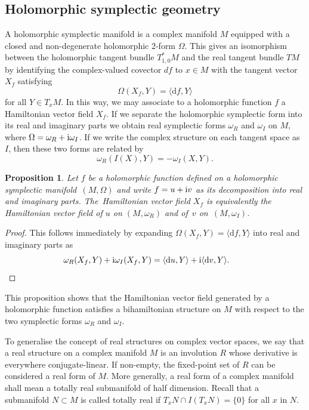 \documentclass[pdftex]{sigma}
\numberwithin{equation}{section}
\newtheorem{Proposition}[Theorem]{Proposition}
 { \theoremstyle{definition}
\newtheorem{Definition}[Theorem]{Definition}
\newtheorem{Note}[Theorem]{Note}
\newtheorem{Example}[Theorem]{Example}
\newtheorem{Remark}[Theorem]{Remark} }
\begin{document}
\subsection{Holomorphic symplectic geometry}
A holomorphic symplectic manifold is a complex manifold $M$ equipped with a closed and non-degenerate holomorphic 2-form $\Omega$. This gives an isomorphism between the holomorphic tangent bundle $T^*_{1,0}M$ and the real tangent bundle $TM$ by identifying the complex-valued covector $df$ to $x\in M$ with the tangent vector $X_f$ satisfying
\[
\Omega(X_f,Y)=\langle \mathrm{d}f, Y\rangle
\]
for all $Y\in T_xM$. In this way, we may associate to a holomorphic function $f$ a Hamiltonian vector field $X_f$.
If we separate the holomorphic symplectic form into its real and imaginary parts we obtain real symplectic forms $\omega_R$ and $\omega_I$ on $M$, where $\Omega=\omega_R+{\rm i}\omega_I$. If we write the complex structure on each tangent space as $I$, then these two forms are related by
\begin{equation}
	\label{wRwIrelated}
	\omega_R(I(X),Y)=-\omega_I(X,Y).
\end{equation}
\begin{Proposition}\label{bihamiltonian}
	Let $f$ be a holomorphic function defined on a holomorphic symplectic manifold~$(M,\Omega)$ and write $f=u+{\rm i}v$ as its decomposition into real and imaginary parts. The~Hamiltonian vector field $X_f$ is equivalently the Hamiltonian vector field of $u$ on $(M,\omega_R)$ and of~$v$ on~$(M,\omega_I)$.
\end{Proposition}
\begin{proof}
	This follows immediately by expanding $\Omega(X_f,Y)=\langle \mathrm{d}f, Y\rangle$ into real and imaginary parts as
	\[
	\omega_R(X_f,Y)+{\rm i}\omega_I(X_f,Y)=\langle \mathrm{d}u, Y\rangle+{\rm i}\langle \mathrm{d}v,Y\rangle.
\tag*{\qed}
 \]
\renewcommand{\qed}{}
\end{proof}

This proposition shows that the Hamiltonian vector field generated by a holomorphic function satisfies a bihamiltonian structure on $M$ with respect to the two symplectic forms $\omega_R$ and $\omega_I$.

To generalise the concept of real structures on complex vector spaces, we say that a real structure on a complex manifold $M$ is an involution $R$ whose derivative is everywhere conjugate-linear. If non-empty, the fixed-point set of $R$ can be considered a real form of $M$. More generally, a real form of a complex manifold shall mean a totally real submanifold of half dimension. Recall that a submanifold $N\subset M$ is called totally real if $T_xN\cap I(T_xN)=\{0\}$ for all $x$ in $N$.
\end{document}
